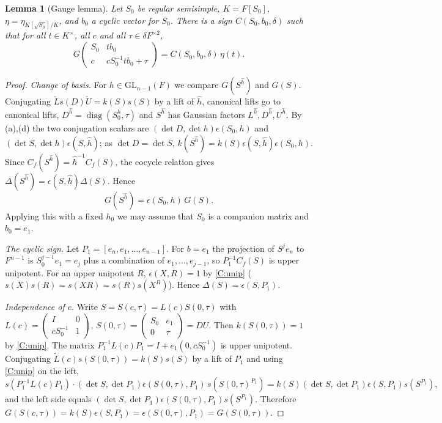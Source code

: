 \documentclass[11pt,oneside,notitlepage]{book}
\numberwithin{equation}{section}
\theoremstyle{plain}
\newtheorem{lemma}[theorem]{Lemma}
\theoremstyle{definition}
\newcommand{\GL}{\mathrm{GL}}
\newcommand{\cS}{\mathcal{S}}
\newcommand{\diag}{\operatorname{diag}}
\newcommand{\hil}[2]{(#1,#2)}
\begin{document}
\begin{lemma}[Gauge lemma]\label{lem:gauge}
	Let $S_0$ be regular semisimple, $K=F[S_0]$, $\eta=\eta_{K[\sqrt{S_0}]/K}$, and $b_0$ a cyclic vector for $S_0$. There is a sign $C(S_0,b_0,\delta)$ such that for all $t\in K^\times$, all $c$ and all $\tau \in\delta F^{\times2}$,
	\[G\begin{pmatrix}S_0&tb_0\\c&cS_0^{-1}tb_0+\tau \end{pmatrix}=C(S_0,b_0,\delta)\,\eta(t).\]
\end{lemma}
\begin{proof}
	\emph{Change of basis.} For $h\in\GL_{n-1}(F)$ we compare $G(S^{\hat h})$ and $G(S)$. Conjugating $\tilde Ls(D)\tilde U=k(S)s(S)$ by a lift of $\hat h$, canonical lifts go to canonical lifts, $D^{\hat h}=\diag(S_0^h,\tau )$ and $S^{\hat h}$ has Gaussian factors $L^{\hat h},D^{\hat h},U^{\hat h}$. By (a),(d) the two conjugation scalars are $\hil{\det D}{\det h}\epsilon(S_0,h)$ and $\hil{\det S}{\det h}\epsilon(S,\hat h)$; as $\det D=\det S$, $k(S^{\hat h})=k(S)\epsilon(S,\hat h)\epsilon(S_0,h)$. Since $C_f(S^{\hat h})=\hat h^{-1}C_f(S)$, the cocycle relation gives $\Delta(S^{\hat h})=\epsilon(S,\hat h)\Delta(S)$. Hence
	\begin{equation}\label{eq:G-change}
		G(S^{\hat h})=\epsilon(S_0,h)\,G(S).
	\end{equation}
	Applying this with a fixed $h_0$ we may assume that $S_0$ is a companion matrix and $b_0=e_1$.
	
	\emph{The cyclic sign.} Let $P_1=[e_n,e_1,\dots,e_{n-1}]$. For $b=e_1$ the projection of $S^je_n$ to $F^{n-1}$ is $S_0^{j-1}e_1=e_j$ plus a combination of $e_1,\dots,e_{j-1}$, so $P_1^{-1}C_f(S)$ is upper unipotent. For an upper unipotent $R$, $\epsilon(X,R)=1$ by \ref{C:unip} ($s(X)s(R)=s(XR)=s(R)s(X^R)$). Hence $\Delta(S)=\epsilon(S,P_1)$.
	
	\emph{Independence of $c$.} Write $S=S(c,\tau )=L(c)S(0,\tau )$ with $L(c)=\left(\begin{smallmatrix}I&0\\cS_0^{-1}&1\end{smallmatrix}\right)$, $S(0,\tau )=\left(\begin{smallmatrix}S_0&e_1\\0&\tau \end{smallmatrix}\right)=DU$. Then $k(S(0,\tau ))=1$ by \ref{C:unip}. The matrix $P_1^{-1}L(c)P_1=I+e_1(0,cS_0^{-1})$ is upper unipotent. Conjugating $\tilde L(c)s(S(0,\tau ))=k(S)s(S)$ by a lift of $P_1$ and using \ref{C:unip} on the left,
	\[s(P_1^{-1}L(c)P_1)\cdot\hil{\det S}{\det P_1}\epsilon(S(0,\tau ),P_1)\,s(S(0,\tau )^{P_1})=k(S)\hil{\det S}{\det P_1}\epsilon(S,P_1)s(S^{P_1}),\]
	and the left side equals $\hil{\det S}{\det P_1}\epsilon(S(0,\tau ),P_1)s(S^{P_1})$. Therefore $G(S(c,\tau ))=k(S)\epsilon(S,P_1)=\epsilon(S(0,\tau ),P_1)=G(S(0,\tau ))$.
	

\end{proof}
\end{document}
